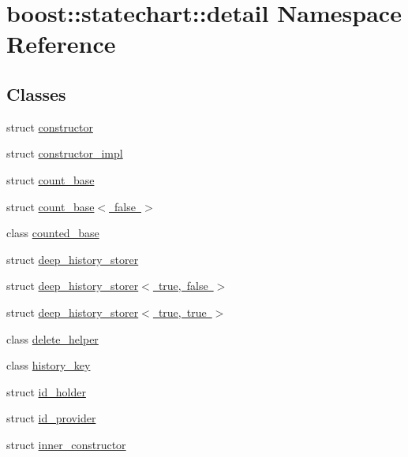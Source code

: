 \hypertarget{namespaceboost_1_1statechart_1_1detail}{}\section{boost\+:\+:statechart\+:\+:detail Namespace Reference}
\label{namespaceboost_1_1statechart_1_1detail}
\subsection*{Classes}
\begin{DoxyCompactItemize}
\item 
struct \mbox{\hyperlink{structboost_1_1statechart_1_1detail_1_1constructor}{constructor}}
\item 
struct \mbox{\hyperlink{structboost_1_1statechart_1_1detail_1_1constructor__impl}{constructor\+\_\+impl}}
\item 
struct \mbox{\hyperlink{structboost_1_1statechart_1_1detail_1_1count__base}{count\+\_\+base}}
\item 
struct \mbox{\hyperlink{structboost_1_1statechart_1_1detail_1_1count__base_3_01false_01_4}{count\+\_\+base$<$ false $>$}}
\item 
class \mbox{\hyperlink{classboost_1_1statechart_1_1detail_1_1counted__base}{counted\+\_\+base}}
\item 
struct \mbox{\hyperlink{structboost_1_1statechart_1_1detail_1_1deep__history__storer}{deep\+\_\+history\+\_\+storer}}
\item 
struct \mbox{\hyperlink{structboost_1_1statechart_1_1detail_1_1deep__history__storer_3_01true_00_01false_01_4}{deep\+\_\+history\+\_\+storer$<$ true, false $>$}}
\item 
struct \mbox{\hyperlink{structboost_1_1statechart_1_1detail_1_1deep__history__storer_3_01true_00_01true_01_4}{deep\+\_\+history\+\_\+storer$<$ true, true $>$}}
\item 
class \mbox{\hyperlink{classboost_1_1statechart_1_1detail_1_1delete__helper}{delete\+\_\+helper}}
\item 
class \mbox{\hyperlink{classboost_1_1statechart_1_1detail_1_1history__key}{history\+\_\+key}}
\item 
struct \mbox{\hyperlink{structboost_1_1statechart_1_1detail_1_1id__holder}{id\+\_\+holder}}
\item 
struct \mbox{\hyperlink{structboost_1_1statechart_1_1detail_1_1id__provider}{id\+\_\+provider}}
\item 
struct \mbox{\hyperlink{structboost_1_1statechart_1_1detail_1_1inner__constructor}{inner\+\_\+constructor}}

\end{DoxyCompactItemize}
